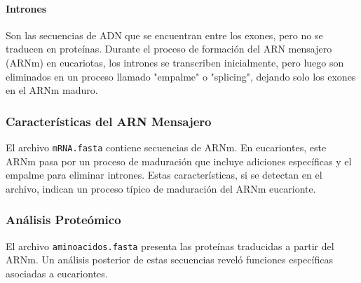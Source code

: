 \paragraph{Intrones}

Son las secuencias de ADN que se encuentran entre los exones, pero no se traducen en proteínas. Durante el proceso de formación del ARN mensajero (ARNm) en eucariotas, los intrones se transcriben inicialmente, pero luego son eliminados en un proceso llamado "empalme" o "splicing", dejando solo los exones en el ARNm maduro.

\subsubsection*{Características del ARN Mensajero}

El archivo \texttt{mRNA.fasta} contiene secuencias de ARNm. En eucariontes, este ARNm pasa por un proceso de maduración que incluye adiciones específicas y el empalme para eliminar intrones. Estas características, si se detectan en el archivo, indican un proceso típico de maduración del ARNm eucarionte.

\subsubsection*{Análisis Proteómico}

El archivo \texttt{aminoacidos.fasta} presenta las proteínas traducidas a partir del ARNm. Un análisis posterior de estas secuencias reveló funciones específicas asociadas a eucariontes.
